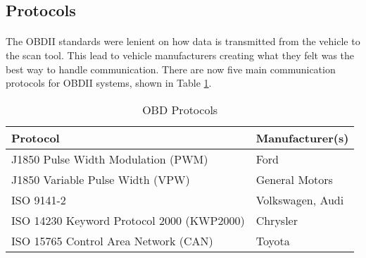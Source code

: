 	\subsection{Protocols}{
		\paragraph{}{
		The OBDII standards were lenient on how data is transmitted from the vehicle to the scan tool. This lead to vehicle manufacturers creating what they felt was the best way to handle communication. There are now five main communication protocols for OBDII systems, shown in Table \ref{tab:Protocols}.
		\begin{table}[h]
			\begin{center}				
				\begin{tabular}{| l | l |}
				\hline
				\textbf{Protocol} & \textbf{Manufacturer(s)}\\
				\hline
				J1850 Pulse Width Modulation (PWM) & Ford\\
				\hline
				J1850 Variable Pulse Width (VPW) & General Motors\\
				\hline
				ISO 9141-2 & Volkswagen, Audi\\
				\hline
				ISO 14230 Keyword Protocol 2000 (KWP2000) & Chrysler\\
				\hline
				ISO 15765 Control Area Network (CAN) & Toyota\\
				\hline			
				\end{tabular}
				\caption{OBD Protocols}
				\label{tab:Protocols}
			\end{center}
		\end{table}	
		}		
}
